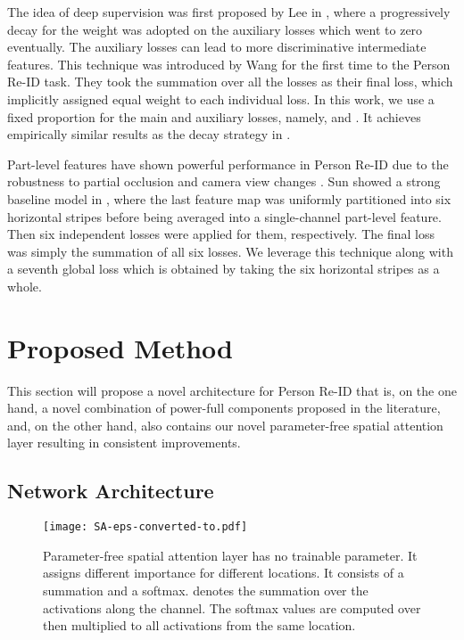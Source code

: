 \documentclass[10pt,twocolumn,letterpaper]{article}
\newcommand{\myparagraph}[1]{\vspace{3pt}\noindent{\bf #1}}
\begin{document}
\myparagraph{Deep Supervision and Part-Level Feature.}
The idea of deep supervision was first proposed by Lee \etal in \cite{deepsupervision}, where a progressively decay for the weight was adopted on the auxiliary losses which went to zero eventually. The auxiliary losses can lead to more discriminative intermediate features.
This technique was introduced by Wang \etal \cite{dare} for the first time to the Person Re-ID task. They took the summation over all the losses as their final loss, which implicitly assigned equal weight to each individual loss. In this work, we use a fixed proportion for the main and auxiliary losses, namely,  and . It achieves empirically similar results as the decay strategy in \cite{deepsupervision}.


Part-level features have shown powerful performance in Person Re-ID due to the robustness to partial occlusion and camera view changes \cite{pcb, pcb1, pcb2, pcb3}. Sun \etal showed a strong baseline model in \cite{pcb}, where the last feature map was uniformly partitioned into six horizontal stripes before being averaged into a single-channel part-level feature. Then six independent losses were applied for them, respectively. The final loss was simply the summation of all six losses. We leverage this technique along with a seventh global loss which is obtained by taking the six horizontal stripes as a whole.






\section{Proposed Method}




This section will propose a novel architecture for Person Re-ID that is, on the one hand, a novel combination of power-full components proposed in the literature, and, on the other hand, also contains our novel parameter-free spatial attention layer resulting in consistent improvements.




\subsection{Network Architecture} \label{net}

\begin{figure*}[!ht]
  \centering
  \texttt{[image: SA-eps-converted-to.pdf]}
  \caption{Parameter-free spatial attention layer has no trainable parameter. It assigns different importance for different locations. It consists of a summation and a softmax.  denotes the summation over the activations along the channel. The softmax values are computed over  then multiplied to all activations from the same location.}
  \label{fig:SA}
\end{figure*}
\end{document}
